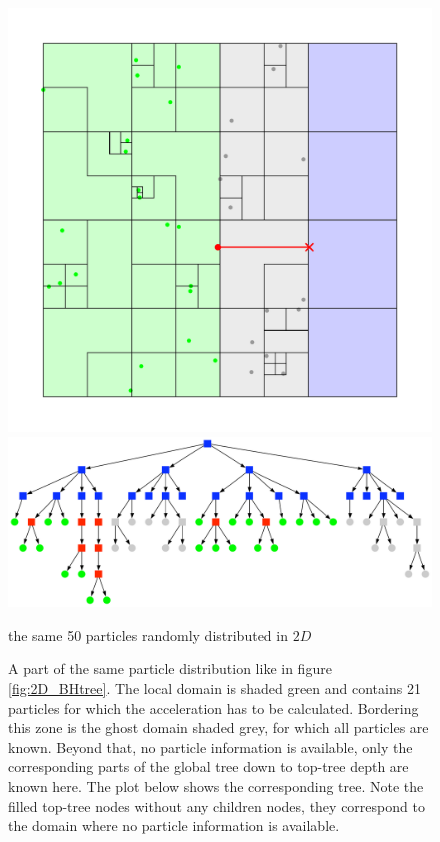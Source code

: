 \begin{figure}[htbp]
\begin{center}
\includegraphics[scale=0.6]{quadtree50_xy_TPL2.pdf}
\includegraphics[scale=0.3]{quadtree50_TPL2.pdf}
\caption{the same 50 particles randomly distributed in $2D$}
\caption{A part of the same particle distribution like in figure \ref{fig:2D_BHtree}. The local domain is shaded green and contains 21 particles for which the acceleration has to be calculated. Bordering this zone is the ghost domain shaded grey, for which all particles are known. Beyond that, no particle information is available, only the corresponding parts of the global tree down to top-tree depth are known here. The plot below shows the corresponding tree. Note the filled top-tree nodes without any children nodes, they correspond to the domain where no particle information is available.}
\label{fig:2D_BHtree_costzone}
\end{center}
\end{figure}



